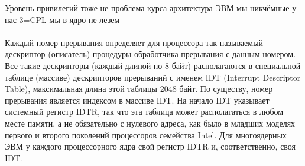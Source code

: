 \documentclass[a4paper,10pt]{article}
\begin{document}
Уровень привилегий тоже не проблема курса архитектура ЭВМ мы никчёмные у нас 3=CPL мы в ядро не лезем\\
\vspace{0.5cm} \\
Каждый номер прерывания определяет для процессора так называемый дескриптор (описатель) процедуры-обработчика прерывания с данным номером. Все такие дескрипторы (каждый длиной по 8 байт) располагаются в специальной таблице (массиве) дескрипторов прерываний с
именем IDT (Interrupt Descriptor Table), максимальная длина этой таблицы 2048 байт. По
существу, номер прерывания является индексом в массиве IDT. На начало IDT указывает системный
регистр IDTR, так что эта таблица может располагаться в любом месте памяти, а не обязательно с
нулевого адреса, как было в младших моделях первого и второго поколений процессоров семейства
Intel. Для многоядерных ЭВМ у каждого процессорного ядра свой регистр IDTR и, соответственно,
своя IDT.
\end{document}
